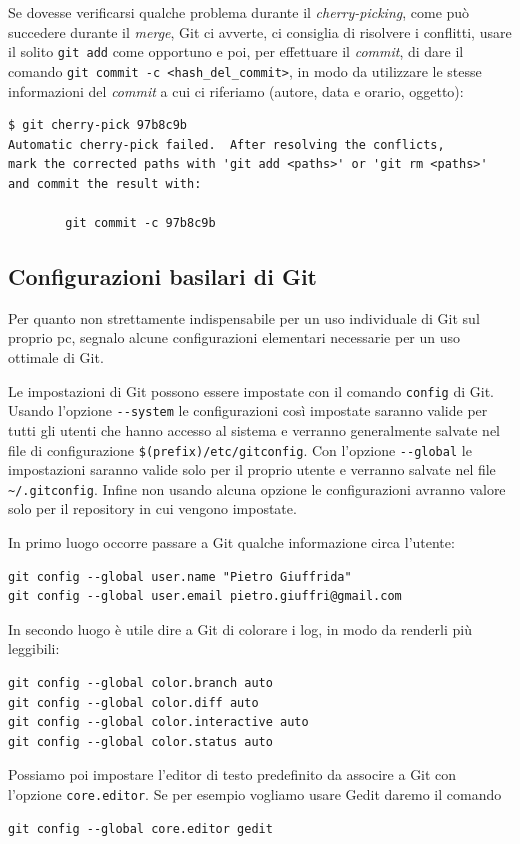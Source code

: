 \documentclass[a4paper,12pt,oneside]{article}
\begin{document}
Se dovesse verificarsi qualche problema durante il \emph{cherry-picking}, come
può succedere durante il \emph{merge}, Git ci avverte, ci consiglia di risolvere
i conflitti, usare il solito \lstinline|git add| come opportuno e poi, per
effettuare il \emph{commit}, di dare il comando
\lstinline|git commit -c <hash_del_commit>|, in modo da utilizzare le stesse
informazioni del \emph{commit} a cui ci riferiamo (autore, data e orario,
oggetto):
\begin{lstlisting}[language={},emph={}]
$ git cherry-pick 97b8c9b
Automatic cherry-pick failed.  After resolving the conflicts,
mark the corrected paths with 'git add <paths>' or 'git rm <paths>'
and commit the result with:

        git commit -c 97b8c9b
\end{lstlisting}

\subsection{Configurazioni basilari di Git}
\label{sec:configurazioni-basilari}

Per quanto non strettamente indispensabile per un uso individuale di Git sul
proprio pc, segnalo alcune configurazioni elementari necessarie per un uso
ottimale di Git.

Le impostazioni di Git possono essere impostate con il comando
\lstinline|config| di Git. Usando l'opzione \lstinline|--system| le configurazioni
così impostate saranno valide per tutti gli utenti che hanno accesso al sistema
e verranno generalmente salvate nel file di configurazione
\lstinline|$(prefix)/etc/gitconfig|. Con l'opzione \lstinline|--global| le impostazioni
saranno valide solo per il proprio utente e verranno salvate nel file
\lstinline|~/.gitconfig|. Infine non usando alcuna opzione le configurazioni
avranno valore solo per il repository in cui vengono impostate.

In primo luogo occorre passare a Git qualche informazione circa l'utente:
\begin{lstlisting}
git config --global user.name "Pietro Giuffrida"
git config --global user.email pietro.giuffri@gmail.com
\end{lstlisting}
In secondo luogo è utile dire a Git di colorare i log, in modo da renderli più
leggibili:
\begin{lstlisting}
git config --global color.branch auto
git config --global color.diff auto
git config --global color.interactive auto
git config --global color.status auto
\end{lstlisting}
Possiamo poi impostare l'editor di testo predefinito da associre a Git con
l'opzione \lstinline|core.editor|. Se per esempio vogliamo usare Gedit daremo
il comando
\begin{lstlisting}
git config --global core.editor gedit
\end{lstlisting}
\end{document}
